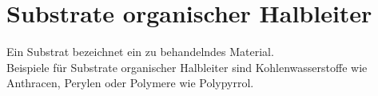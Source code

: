 
\section{Substrate organischer Halbleiter}
\label{sec:substrat}

Ein Substrat bezeichnet ein zu behandelndes Material. \\

Beispiele für Substrate organischer Halbleiter sind Kohlenwasserstoffe wie Anthracen, Perylen oder Polymere wie Polypyrrol.